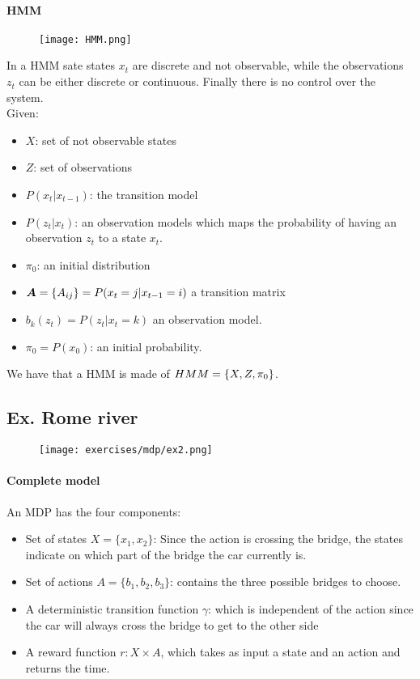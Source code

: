 \paragraph{HMM}
\begin{figure}[H]
    \centering
    \texttt{[image: HMM.png]}
\end{figure}

In a HMM sate states $x_t$ are discrete and not observable, while the observations $z_t$ can be either discrete or continuous. Finally there is no control over the system.\\
Given:
\begin{itemize}
\item $X$: set of not observable states
\item $Z$: set of observations
\item $P(x_t|x_{t-1})$: the transition model 
\item $P(z_t|x_t)$: an observation models which maps the probability of having an observation $z_t$ to a state $x_t$.
\item $\pi_0$: an initial distribution
\item $\bm{A}=\lbrace{A_{ij}}\rbrace=P(x_t=j|x_{t-1}=i)$ a transition matrix
\item $b_k(z_t)=P(z_t|x_t=k)$ an observation model.
\item $\pi_0=P(x_0)$: an initial probability.
\end{itemize}
We have that a HMM is made of $HMM=\lbrace{X,Z,\pi_0}\rbrace$.

\subsection{Ex. Rome river}

\begin{figure}[H]
    \centering
    \texttt{[image: exercises/mdp/ex2.png]}
\end{figure}

\paragraph{Complete model}
An MDP has the four components:
\begin{itemize}
\item Set of states $X=\{x_1,x_2\}$: Since the action is crossing the bridge, the states indicate on which part of the bridge the car currently is.
\item Set of actions $A=\{b_1,b_2,b_3\}$: contains the three possible bridges to choose.
\item A deterministic transition function $\gamma$: which is independent of the action since the car will always cross the bridge to get to the other side
\item A reward function $r: X\times A$, which takes as input a state and an action and returns the time. 
\end{itemize}


